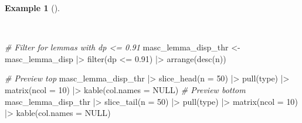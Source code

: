 \documentclass[
  letterpaper,
  DIV=11,
  numbers=noendperiod]{scrreprt}
\newenvironment{Shaded}{\begin{snugshade}}{\end{snugshade}}
\newcommand{\AttributeTok}[1]{\textcolor[rgb]{0.00,0.00,0.00}{#1}}
\newcommand{\CommentTok}[1]{\textcolor[rgb]{0.00,0.00,0.00}{\textit{#1}}}
\newcommand{\ConstantTok}[1]{\textcolor[rgb]{0.00,0.00,0.00}{#1}}
\newcommand{\DecValTok}[1]{\textcolor[rgb]{0.00,0.00,0.00}{#1}}
\newcommand{\FloatTok}[1]{\textcolor[rgb]{0.00,0.00,0.00}{#1}}
\newcommand{\FunctionTok}[1]{\textcolor[rgb]{0.00,0.00,0.00}{#1}}
\newcommand{\NormalTok}[1]{\textcolor[rgb]{0.00,0.00,0.00}{#1}}
\newcommand{\OtherTok}[1]{\textcolor[rgb]{0.00,0.00,0.00}{#1}}
\newcommand{\SpecialCharTok}[1]{\textcolor[rgb]{0.00,0.00,0.00}{#1}}
\theoremstyle{definition}
\newtheorem{example}{Example}[chapter]
\theoremstyle{remark}
\begin{document}
\begin{example}[]\protect\hypertarget{exm-eda-masc-dp-filter}{}\label{exm-eda-masc-dp-filter}

~

\begin{Shaded}
\begin{Highlighting}[]
\CommentTok{\# Filter for lemmas with dp \textless{}= 0.91}
\NormalTok{masc\_lemma\_disp\_thr }\OtherTok{\textless{}{-}}
\NormalTok{  masc\_lemma\_disp }\SpecialCharTok{|\textgreater{}}
  \FunctionTok{filter}\NormalTok{(dp }\SpecialCharTok{\textless{}=} \FloatTok{0.91}\NormalTok{) }\SpecialCharTok{|\textgreater{}}
  \FunctionTok{arrange}\NormalTok{(}\FunctionTok{desc}\NormalTok{(n))}

\CommentTok{\# Preview top}
\NormalTok{masc\_lemma\_disp\_thr }\SpecialCharTok{|\textgreater{}}
  \FunctionTok{slice\_head}\NormalTok{(}\AttributeTok{n =} \DecValTok{50}\NormalTok{) }\SpecialCharTok{|\textgreater{}}
  \FunctionTok{pull}\NormalTok{(type) }\SpecialCharTok{|\textgreater{}}
  \FunctionTok{matrix}\NormalTok{(}\AttributeTok{ncol =} \DecValTok{10}\NormalTok{) }\SpecialCharTok{|\textgreater{}}
  \FunctionTok{kable}\NormalTok{(}\AttributeTok{col.names =} \ConstantTok{NULL}\NormalTok{)}
\CommentTok{\# Preview bottom}
\NormalTok{masc\_lemma\_disp\_thr }\SpecialCharTok{|\textgreater{}}
  \FunctionTok{slice\_tail}\NormalTok{(}\AttributeTok{n =} \DecValTok{50}\NormalTok{) }\SpecialCharTok{|\textgreater{}}
  \FunctionTok{pull}\NormalTok{(type) }\SpecialCharTok{|\textgreater{}}
  \FunctionTok{matrix}\NormalTok{(}\AttributeTok{ncol =} \DecValTok{10}\NormalTok{) }\SpecialCharTok{|\textgreater{}}
  \FunctionTok{kable}\NormalTok{(}\AttributeTok{col.names =} \ConstantTok{NULL}\NormalTok{)}
\end{Highlighting}
\end{Shaded}

\begin{table}

\caption{\label{tbl-eda-masc-dp-filter}Frequency of tokens in the MASC
dataset after filtering out lemmas with a Deviation of Proportions less
than 0.91}

\begin{minipage}{\linewidth}


\end{minipage}
\end{table}
\end{example}
\end{document}
